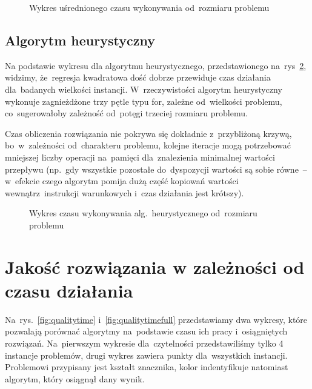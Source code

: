 \documentclass[a4paper,10pt]{article}
\begin{document}
\begin{figure}[h!]
\begin{center}

\caption{Wykres uśrednionego czasu wykonywania od~rozmiaru problemu}
\label{fig:timesize}
\end{center}
\end{figure}

\subsection{Algorytm heurystyczny}
Na podstawie wykresu dla algorytmu heurystycznego, przedstawionego na~rys~\ref{fig:timesizeheuristic},
widzimy, że~regresja kwadratowa dość dobrze przewiduje czas działania dla~badanych wielkości instancji.
W~rzeczywistości algorytm heurystyczny wykonuje zagnieżdżone trzy pętle typu for, zależne od~wielkości problemu,
co~sugerowałoby zależność od~potęgi trzeciej rozmiaru problemu.

Czas obliczenia rozwiązania nie pokrywa się dokładnie z~przybliżoną krzywą, bo~w~zależności od~charakteru problemu,
kolejne iteracje mogą potrzebować mniejszej liczby operacji na~pamięci dla~znalezienia minimalnej wartości przepływu
(np.~gdy wszystkie pozostałe do~dyspozycji wartości są sobie równe~-- w~efekcie czego algorytm pomija dużą część kopiowań
wartości wewnątrz~instrukcji warunkowych i~czas działania jest krótszy).

\begin{figure}[h!]
\begin{center} 

\caption{Wykres czasu wykonywania alg.~heurystycznego od~rozmiaru problemu}
\label{fig:timesizeheuristic}
\end{center}
\end{figure}

%

\section{Jakość rozwiązania w zależności od czasu działania}
Na~rys.~\ref{fig:qualitytime} i~\ref{fig:qualitytimefull} przedstawiamy dwa wykresy,
które pozwalają porównać algorytmy na~podstawie czasu ich pracy i~osiągniętych rozwiązań.
Na~pierwszym wykresie dla~czytelności przedstawiliśmy tylko 4 instancje problemów, drugi wykres zawiera punkty dla~wszystkich instancji. 
Problemowi przypisany jest kształt znacznika, kolor indentyfikuje natomiast algorytm, który osiągnął dany wynik.
\end{document}
